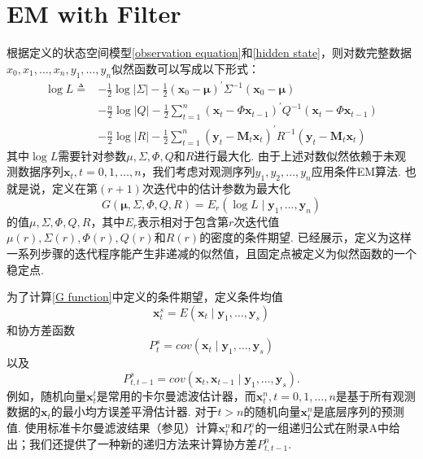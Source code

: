 \documentclass[UTF8,12pt]{ctexart}
\numberwithin{equation}{section}%
\begin{document}
	\section{EM with Filter}
	根据定义的状态空间模型\eqref{observation equation}和\eqref{hidden state}，则对数完整数据$x_0, x_1, \ldots, x_n, y_1, \ldots, y_n$似然函数可以写成以下形式：
	\begin{equation}\label{complete log likelihood}
			\begin{aligned}
			\log L \triangleq & -\frac{1}{2} \log |\Sigma|-\frac{1}{2}\left(\boldsymbol{x}_0-\boldsymbol{\mu}\right)^{\prime} \Sigma^{-1}\left(\boldsymbol{x}_0-\boldsymbol{\mu}\right) \\
			& -\frac{n}{2} \log |Q|-\frac{1}{2} \sum_{t=1}^n\left(\boldsymbol{x}_t-\Phi \boldsymbol{x}_{t-1}\right)^{\prime} Q^{-1}\left(\boldsymbol{x}_t-\Phi \boldsymbol{x}_{t-1}\right) \\
			& -\frac{n}{2} \log |R|-\frac{1}{2} \sum_{t=1}^n\left(\boldsymbol{y}_t-\boldsymbol{M}_t \boldsymbol{x}_t\right)^{\prime} R^{-1}\left(\boldsymbol{y}_t-\boldsymbol{M}_t \boldsymbol{x}_t\right)
		\end{aligned}
	\end{equation}
	其中$\log L$需要针对参数$\mu, \Sigma, \Phi, Q$和$R$进行最大化. 由于上述对数似然依赖于未观测数据序列$\boldsymbol{x}_t, t=0,1, \ldots, n$，我们考虑对观测序列$y_1, y_2, \ldots, y_n$应用条件EM算法. 也就是说，定义在第$(r+1)$次迭代中的估计参数为最大化
	\begin{equation}\label{G function}
		G(\boldsymbol{\mu}, \Sigma, \Phi, Q, R)=E_r\left(\log L \mid \boldsymbol{y}_1, \ldots, \boldsymbol{y}_n\right)
	\end{equation}
	的值$\mu, \Sigma, \Phi, Q, R$，其中$E_r$表示相对于包含第$r$次迭代值$\mu(r), \Sigma(r), \Phi(r), Q(r)$和$R(r)$的密度的条件期望. \citet{dempster1977maximum}已经展示，定义为这样一系列步骤的迭代程序能产生非递减的似然值，且固定点被定义为似然函数的一个稳定点.
	
	为了计算\eqref{G function}中定义的条件期望，定义条件均值
	\begin{equation}\label{x_t filter}
		\boldsymbol{x}_t^s=E\left(\boldsymbol{x}_t \mid \boldsymbol{y}_1, \ldots, \boldsymbol{y}_s\right)
	\end{equation}
	和协方差函数
	\begin{equation}\label{covariance filter}
		P_t^s=cov\left(\boldsymbol{x}_t \mid \boldsymbol{y}_1, \ldots, \boldsymbol{y}_s\right)
	\end{equation}
	以及
	\begin{equation}\label{covariance t_1 filter}
		P_{t, t-1}^s=cov\left(\boldsymbol{x}_t, \boldsymbol{x}_{t-1} \mid \boldsymbol{y}_1, \ldots, \boldsymbol{y}_s\right) .
	\end{equation}
	例如，随机向量$\boldsymbol{x}_t^t$是常用的卡尔曼滤波估计器，而$\boldsymbol{x}_t^n, t=0,1, \ldots, n$是基于所有观测数据的$\boldsymbol{x}_t$的最小均方误差平滑估计器. 对于$t>n$的随机向量$\boldsymbol{x}_t^n$是底层序列的预测值. 使用标准卡尔曼滤波结果（参见\citet{jazwinski2007stochastic}）计算$\boldsymbol{x}_t^n$和$P_t^n$的一组递归公式在附录A中给出；我们还提供了一种新的递归方法来计算协方差$P_{t, t-1}^n$.
	
\end{document}
